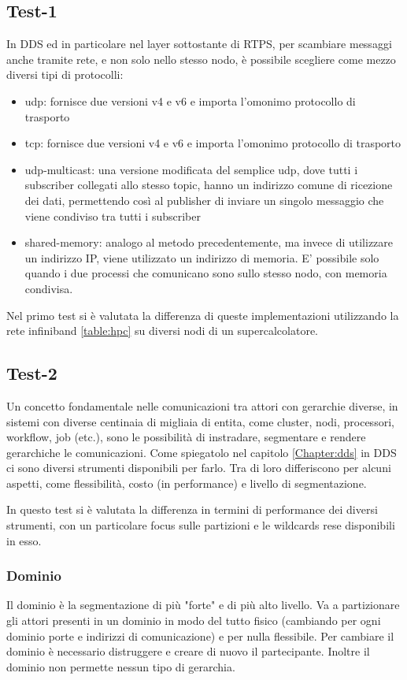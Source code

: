 \subsection{Test-1}
In DDS ed in particolare nel layer sottostante di RTPS, per scambiare messaggi anche tramite rete, e non solo nello stesso nodo, è possibile scegliere come mezzo diversi tipi di protocolli:

\begin{itemize}
    \item udp: fornisce due versioni v4 e v6 e importa l'omonimo protocollo di trasporto
    \item tcp: fornisce due versioni v4 e v6 e importa l'omonimo protocollo di trasporto
    \item udp-multicast: una versione modificata del semplice udp, dove tutti i subscriber collegati allo stesso topic, hanno un indirizzo comune di ricezione dei dati, permettendo così al publisher di inviare un singolo messaggio che viene condiviso tra tutti i subscriber  %
    \item shared-memory: analogo al metodo precedentemente, ma invece di utilizzare un indirizzo IP, viene utilizzato un indirizzo di memoria. E' possibile solo quando i due processi che comunicano sono sullo stesso nodo, con memoria condivisa.
\end{itemize}

Nel primo test si è valutata la differenza di queste implementazioni utilizzando la rete infiniband \ref{table:hpc} su diversi nodi di un supercalcolatore. 

\subsection{Test-2}
Un concetto fondamentale nelle comunicazioni tra attori con gerarchie diverse, in sistemi con diverse centinaia di migliaia di entita, come cluster, nodi, processori, workflow, job (etc.), sono le possibilità di instradare, segmentare e rendere gerarchiche le comunicazioni. Come spiegatolo nel capitolo \ref{Chapter:dds} in DDS ci sono diversi strumenti disponibili per farlo. Tra di loro differiscono per alcuni aspetti, come flessibilità, costo (in performance) e livello di segmentazione.

In questo test si è valutata la differenza in termini di performance dei diversi strumenti, con un particolare focus sulle partizioni e le wildcards rese disponibili in esso.

\subsubsection*{Dominio} 
Il dominio è la segmentazione di più "forte" e di più alto livello. Va a partizionare gli attori presenti in un dominio in modo del tutto fisico (cambiando per ogni dominio porte e indirizzi di comunicazione) e per nulla flessibile. Per cambiare il dominio è necessario distruggere e creare di nuovo il partecipante. Inoltre il dominio non permette nessun tipo di gerarchia.
    
